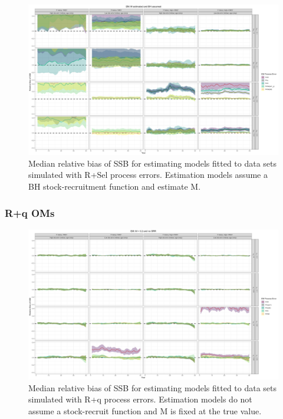 \documentclass[
  12pt,
]{article}
\begin{document}
\begin{landscape}
\begin{figure}
\caption{Median relative bias of SSB for estimating models fitted to data sets simulated with R+Sel process errors. Estimation models assume a BH stock-recruitment function and estimate M.}\label{Sel_om_em_BH_ME_relbias_ssb}
\begin{center}
\includegraphics[width = \textwidth]{Sel_om_BH_ME_relbias_ssb.png}
\end{center}
\end{figure}
\end{landscape}

\hypertarget{rq-oms}{%
\subsubsection*{R+q OMs}\label{rq-oms}}

\begin{landscape}
\begin{figure}
\caption{Median relative bias of SSB for estimating models fitted to data sets simulated with R+q process errors.  Estimation models do not assume a stock-recruit function and M is fixed at the true value.}\label{q_om_em_R_MF_relbias_ssb}
\begin{center}
\includegraphics[width = \textwidth]{q_om_R_MF_relbias_ssb.png}
\end{center}
\end{figure}
\end{landscape}
\end{document}
